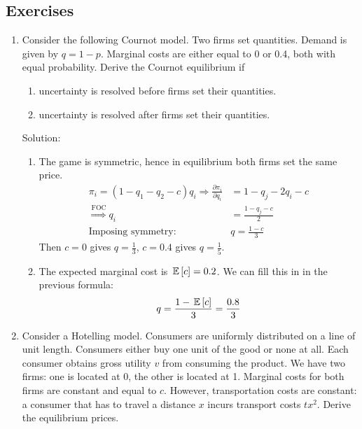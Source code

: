 \subsection{Exercises}
\begin{enumerate}
	\item Consider the following Cournot model. Two firms set quantities. Demand is given by
	      $q=1-p$. Marginal costs are either equal to 0 or 0.4, both with equal probability.
	      Derive the Cournot equilibrium if
	      \begin{enumerate}
		      \item uncertainty is resolved before firms set their quantities.
		      \item uncertainty is resolved after firms set their quantities.
	      \end{enumerate}

	      Solution:
	      \begin{enumerate}
		      \item The game is symmetric, hence in equilibrium both firms set the same
			    price.
			    \begin{align*}
				    \pi_i=(1-q_1-q_2-c)q_i\Longrightarrow\frac{\partial\pi_i}{\partial q_i} & =1-q_j-2q_i-c      \\
				    \overset{\text{FOC}}{\Longrightarrow} q_i                             & =\frac{1-q_j-c}{2}\\
				    \text{Imposing symmetry: }&q=\frac{1-c}{3}
			    \end{align*}
			    Then $c=0$ gives $q=\frac{1}{3}$, $c=0.4$ gives $q=\frac{1}{5}$.
		      \item The expected marginal cost is $\,\mathbb{E}\left[c\right]=0.2$. We can fill this in in 
			    the previous formula:
			    \begin{align*}
				    q=\frac{1-\,\mathbb{E}\left[c\right]}{3}=\frac{0.8}{3}
			    \end{align*}
	      \end{enumerate}
	\item Consider a Hotelling model. Consumers are uniformly distributed on a line of unit
	      length. Consumers either buy one unit of the good or none at all. Each consumer
	      obtains gross utility $v$ from consuming the product. We have two firms: one is
	      located at 0, the other is located at 1. Marginal costs for both firms are constant
	      and equal to $c$. However, transportation costs are constant: a consumer that has
	      to travel a distance $x$ incurs transport costs $tx^2$. Derive the equilibrium prices.


\end{enumerate}
